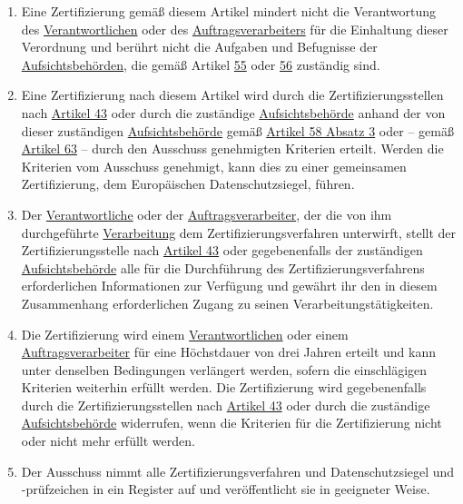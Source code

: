 \begin{enumerate}
  \item Eine Zertifizierung gemäß diesem Artikel mindert nicht die Verantwortung des \hyperref[itm:04-7]
   {Verantwortlichen} oder des
   \hyperref[itm:04-8]{Auftragsverarbeiters} für die Einhaltung dieser Verordnung und berührt nicht die Aufgaben und
    Befugnisse der
   \hyperref[itm:04-21]{Aufsichtsbehörden}, die gemäß Artikel \hyperref[ch:55]{55} oder \hyperref[ch:56]{56} zuständig
    sind.%
  \label{itm:42-4}

  \item Eine Zertifizierung nach diesem Artikel wird durch die Zertifizierungsstellen nach \hyperref[ch:43]{Artikel 43}
   oder durch die zuständige \hyperref[itm:04-21]{Aufsichtsbehörde} anhand der von dieser zuständigen \hyperref
   [itm:04-21]{Aufsichtsbehörde} gemäß \hyperref[itm:58-3]{Artikel 58 Absatz 3} oder -- gemäß \hyperref[ch:63]
   {Artikel 63} -- durch den Ausschuss genehmigten Kriterien erteilt. Werden die Kriterien vom Ausschuss genehmigt,
   kann dies zu einer gemeinsamen Zertifizierung, dem Europäischen Datenschutzsiegel, führen.%
  \label{itm:42-5}

  \item Der \hyperref[itm:04-7]{Verantwortliche} oder der \hyperref[itm:04-8]{Auftragsverarbeiter}, der die von ihm
   durchgeführte \hyperref[itm:04-2]{Verarbeitung} dem Zertifizierungsverfahren unterwirft, stellt der
   Zertifizierungsstelle nach \hyperref[ch:43]{Artikel 43} oder gegebenenfalls der zuständigen \hyperref[itm:04-21]
   {Aufsichtsbehörde} alle für die Durchführung des Zertifizierungsverfahrens erforderlichen Informationen zur
   Verfügung und gewährt ihr den in diesem Zusammenhang erforderlichen Zugang zu seinen Verarbeitungstätigkeiten.%
  \label{itm:42-6}

  \item Die Zertifizierung wird einem \hyperref[itm:04-7]{Verantwortlichen} oder einem \hyperref[itm:04-8]
   {Auftragsverarbeiter} für eine Höchstdauer von drei Jahren erteilt und kann unter denselben Bedingungen verlängert
   werden, sofern die einschlägigen Kriterien weiterhin erfüllt werden. Die Zertifizierung wird gegebenenfalls
   durch die Zertifizierungsstellen nach \hyperref[ch:43]{Artikel 43} oder durch die zuständige \hyperref[itm:04-21]
   {Aufsichtsbehörde} widerrufen, wenn die Kriterien für die Zertifizierung nicht oder nicht mehr erfüllt
   werden.%
  \label{itm:42-7}

  \item Der Ausschuss nimmt alle Zertifizierungsverfahren und Datenschutzsiegel und -prüfzeichen in ein Register auf und
   veröffentlicht sie in geeigneter Weise.%
  \label{itm:42-8}

\end{enumerate}


